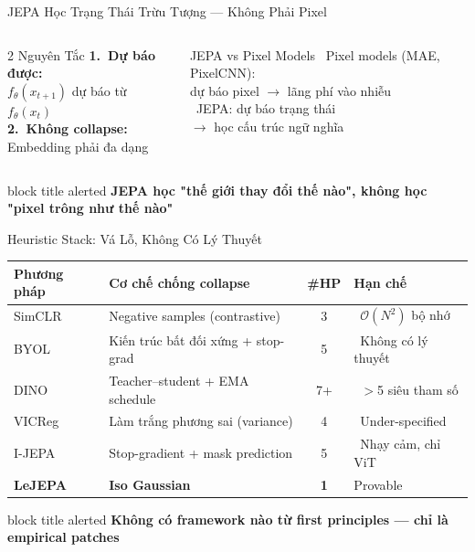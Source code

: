 \documentclass[aspectratio=169,11pt]{beamer}
\newcommand{\cmark}{\ding{51}}
\newcommand{\xmark}{\ding{55}}
\newcommand{\takeaway}[1]{%
  \vfill
  \begin{beamercolorbox}[sep=4pt,center,rounded=true]{block title alerted}
    \small\bfseries #1
  \end{beamercolorbox}%
}
\begin{document}
\begin{frame}{JEPA Học Trạng Thái Trừu Tượng — Không Phải Pixel}
\begin{columns}[c]
  \begin{block}{\footnotesize 2 Nguyên Tắc}
    \footnotesize
    \textbf{1.\ Dự báo được:}\\
    $f_\theta(x_{t+1})$ dự báo từ $f_\theta(x_t)$\\[4pt]
    \textbf{2.\ Không collapse:}\\
    Embedding phải đa dạng
  \end{block}
  \vspace{4pt}
  \begin{alertblock}{\footnotesize JEPA vs Pixel Models}
    \footnotesize
    \textcolor{bad}{\xmark}\ Pixel models (MAE, PixelCNN):\\
    \quad dự báo pixel $\to$ lãng phí vào nhiễu\\[3pt]
    \textcolor{good}{\cmark}\ JEPA: dự báo trạng thái\\
    \quad $\to$ học cấu trúc ngữ nghĩa
  \end{alertblock}
\end{columns}
\takeaway{JEPA học "thế giới thay đổi thế nào", không học "pixel trông như thế nào"}
\end{frame}

\begin{frame}{Heuristic Stack: Vá Lỗ, Không Có Lý Thuyết}
\centering\footnotesize
\renewcommand{\arraystretch}{1.3}
\begin{tabular}{l >{\raggedright\arraybackslash}p{2.8cm} c >{\raggedright\arraybackslash}p{3.0cm}}
\toprule
\textbf{Phương pháp} & \textbf{Cơ chế chống collapse} & \textbf{\#HP} & \textbf{Hạn chế} \\
\midrule
SimCLR  & Negative samples (contrastive)          & 3   & \cellcolor{bad!20}\textcolor{bad}{\xmark}\ $\mathcal{O}(N^2)$ bộ nhớ \\
BYOL    & Kiến trúc bất đối xứng + stop-grad      & 5   & \cellcolor{bad!20}\textcolor{bad}{\xmark}\ Không có lý thuyết \\
DINO    & Teacher--student + EMA schedule          & 7+  & \cellcolor{bad!20}\textcolor{bad}{\xmark}\ $>$5 siêu tham số \\
VICReg  & Làm trắng phương sai (variance)          & 4   & \cellcolor{bad!20}\textcolor{bad}{\xmark}\ Under-specified \\
I-JEPA  & Stop-gradient + mask prediction          & 5   & \cellcolor{bad!20}\textcolor{bad}{\xmark}\ Nhạy cảm, chỉ ViT \\
\midrule
\rowcolor{good!15}
\textbf{LeJEPA} & \textbf{Iso Gaussian} & \textbf{1} & \textcolor{good}{\cmark}\;Provable \\
\bottomrule
\end{tabular}
\takeaway{Không có framework nào từ first principles — chỉ là empirical patches}
\end{frame}
\end{document}
